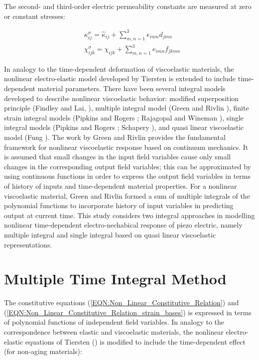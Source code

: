 The second- and third-order electric permeability constants are measured at zero or constant stresses:

\begin{equation}
\begin{aligned}
& {\kappa^{\sigma}_{ij}}= {\hat{\kappa}_{ij}}+\sum_{m,n=1}^3  e_{imn} d_{jmn} \\
& \chi^{\sigma}_{ijk} =    \chi_{ijk}+ \sum_{m,n=1}^3 e_{imn} f_{jkmn}
\end{aligned}
\label{EQN:Non_relation_with_constants_2} 
\end{equation}

 
In analogy to the time-dependent deformation of viscoelastic materials, the nonlinear electro-elastic model developed by Tiersten \cite{tiersten1993electroelastic} is extended to include time-dependent material parameters. 
There have been several integral models developed to describe nonlinear viscoelastic behavior:
 modified superposition principle (Findley and Lai, \cite{Findley1976}),
  multiple integral model (Green and Rivlin \cite{green1959mechanics}),
   finite strain integral models (Pipkins and Rogers \cite{pipkin1968non};
    Rajagopal and Wineman \cite{Wineman2000}),
     single integral models (Pipkins and Rogers \cite{pipkin1968non}; Schapery \cite{schapery1969characterization}),
      and quasi linear viscoelastic model (Fung \cite{fung1981biomechanics}). 
The work by Green and Rivlin \cite{green1959mechanics} provides the fundamental framework for nonlinear viscoelastic response based on continuum mechanics.
 It is assumed that small changes in the input field variables cause only small changes in the corresponding output field variables;
  this can be approximated by using continuous functions in order to express the output field variables in terms of history of inputs and time-dependent material properties. 
For a nonlinear viscoelastic material,
 Green and Rivlin \cite{green1959mechanics} formed a sum of multiple integrals of the polynomial functions to incorporate history of input variables in predicting output at current time.
 This study considers two integral approaches in modelling nonlinear time-dependent electro-nechabical response of piezo electric,
  namely multiple integral and single integral based on quasi linear viscoelastic representations.
 
\section{Multiple Time Integral Method} 
The constitutive equations (\ref{EQN:Non_Linear_Constitutive_Relation}) and
(\ref{EQN:Non_Linear_Constitutive_Relation_strain_bases}) is expressed in terms of polynomial functions of independent field variables.
In analogy to the correspondence between elastic and viscoelastic materials,
 the nonlinear electro-elastic equations of Tiersten (\cite{tiersten1993electroelastic}) is modified to include the time-dependent effect (for non-aging materials):
  
